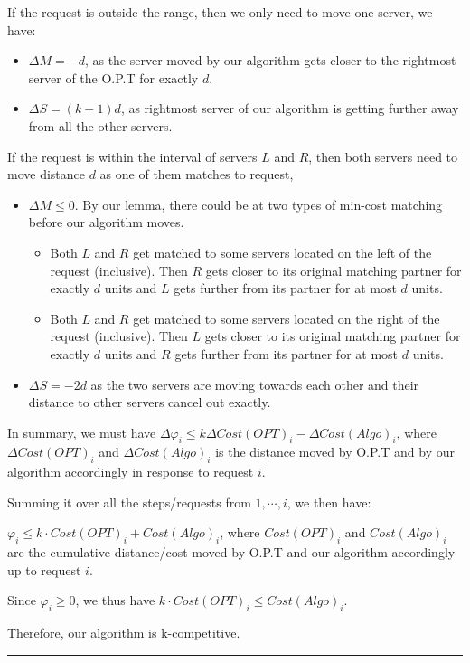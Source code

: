 \documentclass[11pt]{article}
\newenvironment{proof}{{\bf Proof:  }}{\hfill\rule{2mm}{2mm}}
\begin{document}
\begin{proof}
If the request is outside the range, then we only need to move one server, we have:
\begin{itemize}
    \item $\Delta{M} = -d$, as the server moved by our algorithm gets closer to the rightmost server of the O.P.T for exactly $d$.
    \item $\Delta{S} = (k-1)d$, as rightmost server of our algorithm is getting further away from all the other servers.
\end{itemize}
If the request is within the interval of servers $L$ and $R$, then both servers need to move distance $d$ as one of them matches to request,
\begin{itemize}
    \item $\Delta{M} \le 0$. By our lemma, there could be at two types of min-cost matching before our algorithm moves. 
    \begin{itemize}
        \item Both $L$ and $R$ get matched to some servers located on the left of the request (inclusive). Then $R$ gets closer to its original matching partner for exactly $d$ units and $L$ gets further from its partner for at most $d$ units.
        \item Both $L$ and $R$ get matched to some servers located on the right of the request (inclusive). Then $L$ gets closer to its original matching partner for exactly $d$ units and $R$ gets further from its partner for at most $d$ units.
    \end{itemize}
    \item $\Delta{S} = -2d$ as the two servers are moving towards each other and their distance to other servers cancel out exactly.
\end{itemize}


In summary, we must have $\Delta{\varphi}_i \leq k \Delta{Cost(OPT)}_i - \Delta{Cost(Algo)}_i$, where $\Delta{Cost(OPT)}_i$ and $\Delta{Cost(Algo)}_i$ is the distance moved by O.P.T and by our algorithm accordingly in response to request $i$.

Summing it over all the steps/requests from $1, \cdots, i$, we then have:

$\varphi_i \leq k \cdot Cost(OPT)_i + Cost(Algo)_i$, where $Cost(OPT)_i$ and $Cost(Algo)_i$ are the cumulative distance/cost moved by O.P.T and our algorithm accordingly up to request $i$.

Since $\varphi_i \geq 0$, we thus have $ k \cdot Cost(OPT)_i \leq Cost(Algo)_i$.

Therefore, our algorithm is k-competitive. 
\end{proof}
\end{document}

